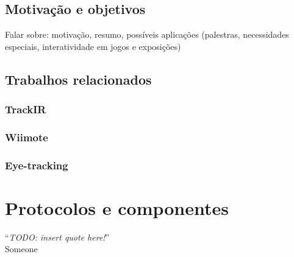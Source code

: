 \documentclass[brazil,pagestart=firstchapter]{abnt}
\begin{document}
\section{Motivação e objetivos}
\label{sec:motivacao}

Falar sobre: motivação, resumo, possíveis aplicações (palestras,
necessidades especiais, interatividade em jogos e exposições)

\section{Trabalhos relacionados}
\label{sec:trabalhos_relacionados}

\subsection{TrackIR}
\label{sub:trackir}


\subsection{Wiimote}
\label{sub:wiimote}


\subsection{Eye-tracking}
\label{sub:eyetracking}



\chapter{Protocolos e componentes}
\label{cap:protocolos_e_componentes}


\vfill{}
\begin{flushright}{}
``\emph{TODO: insert quote here!}''\\
{\small Someone}
\end{flushright}{\small \par}
\vfill{}

\newpage
\end{document}
